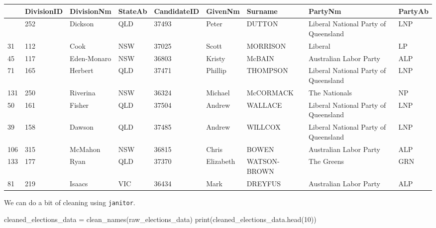 \documentclass[
  letterpaper,
  DIV=11,
  numbers=noendperiod]{scrreprt}
\newenvironment{Shaded}{\begin{snugshade}}{\end{snugshade}}
\newcommand{\BuiltInTok}[1]{\textcolor[rgb]{0.00,0.23,0.31}{#1}}
\newcommand{\DecValTok}[1]{\textcolor[rgb]{0.68,0.00,0.00}{#1}}
\newcommand{\NormalTok}[1]{\textcolor[rgb]{0.00,0.23,0.31}{#1}}
\newcommand{\OperatorTok}[1]{\textcolor[rgb]{0.37,0.37,0.37}{#1}}
\begin{document}
\begin{longtable}[]{@{}lllllllll@{}}
\toprule\noalign{}
& DivisionID & DivisionNm & StateAb & CandidateID & GivenNm & Surname &
PartyNm & PartyAb \\
\midrule\noalign{}
\endhead
\bottomrule\noalign{}
\endlastfoot
41 & 252 & Dickson & QLD & 37493 & Peter & DUTTON & Liberal National
Party of Queensland & LNP \\
31 & 112 & Cook & NSW & 37025 & Scott & MORRISON & Liberal & LP \\
45 & 117 & Eden-Monaro & NSW & 36803 & Kristy & McBAIN & Australian
Labor Party & ALP \\
71 & 165 & Herbert & QLD & 37471 & Phillip & THOMPSON & Liberal National
Party of Queensland & LNP \\
131 & 250 & Riverina & NSW & 36324 & Michael & McCORMACK & The Nationals
& NP \\
50 & 161 & Fisher & QLD & 37504 & Andrew & WALLACE & Liberal National
Party of Queensland & LNP \\
39 & 158 & Dawson & QLD & 37485 & Andrew & WILLCOX & Liberal National
Party of Queensland & LNP \\
106 & 315 & McMahon & NSW & 36815 & Chris & BOWEN & Australian Labor
Party & ALP \\
133 & 177 & Ryan & QLD & 37370 & Elizabeth & WATSON-BROWN & The Greens &
GRN \\
81 & 219 & Isaacs & VIC & 36434 & Mark & DREYFUS & Australian Labor
Party & ALP \\
\end{longtable}

We can do a bit of cleaning using \texttt{janitor}.

\begin{Shaded}
\begin{Highlighting}[]
\NormalTok{cleaned\_elections\_data }\OperatorTok{=}\NormalTok{ clean\_names(raw\_elections\_data)}
\BuiltInTok{print}\NormalTok{(cleaned\_elections\_data.head(}\DecValTok{10}\NormalTok{))}
\end{Highlighting}
\end{Shaded}
\end{document}

